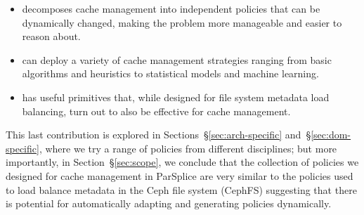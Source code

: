 \begin{itemize}

  \item decomposes cache management into independent policies that can be
  dynamically changed, making the problem more manageable and easier to reason
  about.

  \item can deploy a variety of cache management strategies ranging from basic
  algorithms and heuristics to statistical models and machine learning.

  \item has useful primitives that, while designed for file system metadata
  load balancing, turn out to also be effective for cache management. 

\end{itemize}


This last contribution is explored in Sections~\S\ref{sec:arch-specific}
and~\S\ref{sec:dom-specific}, where we try a range of policies from different
disciplines; but more importantly, in Section~\S\ref{sec:scope}, we conclude
that the collection of policies we designed for cache management in ParSplice
are very similar to the policies used to load balance metadata in the Ceph file
system (CephFS) suggesting that there is potential for automatically adapting
and generating policies dynamically.  



